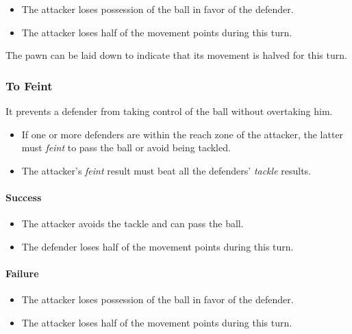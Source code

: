 \documentclass[12pt]{article}
\begin{document}
\begin{rulebox}
\begin{itemize}
\item The attacker loses possession of the ball in favor of the defender.
\item The attacker loses half of the movement points during this turn.
\end{itemize}
\end{rulebox}

\begin{hint}
The pawn can be laid down to indicate that its movement is halved for this turn.
\end{hint}

\subsubsection{To Feint}
It prevents a defender from taking control of the ball without overtaking him.

\begin{rulebox}
\begin{itemize}
\item If one or more defenders are within the reach zone of the attacker, the latter must \emph{feint }to pass the ball or avoid being tackled.
\item The attacker's \emph{feint }result must beat all the defenders' \emph{tackle }results.
\end{itemize}
\end{rulebox}

\paragraph{Success}

\begin{rulebox}
\begin{itemize}
\item The attacker avoids the tackle and can pass the ball.
\item The defender loses half of the movement points during this turn.
\end{itemize}
\end{rulebox}

\paragraph{Failure}

\begin{rulebox}
\begin{itemize}
\item The attacker loses possession of the ball in favor of the defender.
\item The attacker loses half of the movement points during this turn.
\end{itemize}
\end{rulebox}
\end{document}
